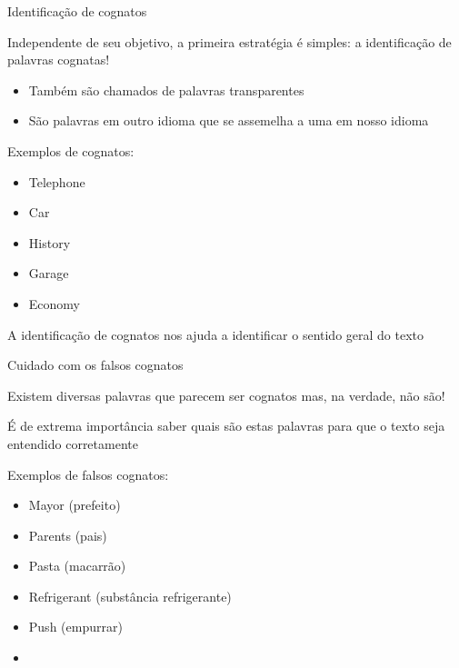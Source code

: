 \documentclass[compress,mathserif]{beamer}
\begin{document}
\begin{frame}{Identificação de cognatos}

Independente de seu objetivo, a primeira estratégia é simples: a identificação de palavras cognatas!
\begin{itemize}
    \item Também são chamados de palavras transparentes
    \item São palavras em outro idioma que se assemelha a uma em nosso idioma
\end{itemize}

\vspace{0.5cm}

Exemplos de cognatos:
\begin{itemize}
    \item Telephone
    \item Car
    \item History
    \item Garage
    \item Economy
\end{itemize}

\vspace{0.5cm}

A identificação de cognatos nos ajuda a identificar o sentido geral do texto

\end{frame}


\begin{frame}{Cuidado com os falsos cognatos}

Existem diversas palavras que parecem ser cognatos mas, na verdade, não são!

\vspace{0.5cm}

É de extrema importância saber quais são estas palavras para que o texto seja entendido corretamente

\vspace{0.5cm}

Exemplos de falsos cognatos:
\begin{itemize}
    \item Mayor (prefeito)
    \item Parents (pais)
    \item Pasta (macarrão)
    \item Refrigerant (substância refrigerante)
    \item Push (empurrar)
    \item \href{https://www.sk.com.br/sk-falsos-cognatos-ou-falsos-amigos.html}{}
\end{itemize}
\end{frame}
\end{document}

